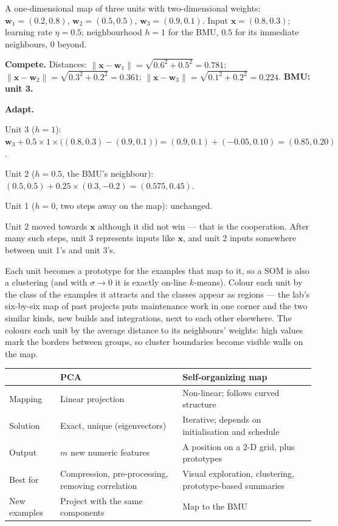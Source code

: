 \begin{worked}
A one-dimensional map of three units with two-dimensional weights:
$\mathbf{w}_1 = (0.2, 0.8)$, $\mathbf{w}_2 = (0.5, 0.5)$, $\mathbf{w}_3 = (0.9, 0.1)$.
Input $\mathbf{x} = (0.8, 0.3)$; learning rate $\eta = 0.5$; neighbourhood $h = 1$ for
the BMU, $0.5$ for its immediate neighbours, 0 beyond.

\smallskip
\textbf{Compete.} Distances: $\|\mathbf{x} - \mathbf{w}_1\| = \sqrt{0.6^2 + 0.5^2} = 0.781$;
$\|\mathbf{x} - \mathbf{w}_2\| = \sqrt{0.3^2 + 0.2^2} = 0.361$;
$\|\mathbf{x} - \mathbf{w}_3\| = \sqrt{0.1^2 + 0.2^2} = 0.224$. \textbf{BMU: unit 3.}

\textbf{Adapt.}
\begin{tight}
  \item Unit 3 ($h = 1$): $\mathbf{w}_3 + 0.5 \times 1 \times \big((0.8, 0.3) - (0.9, 0.1)\big)
        = (0.9, 0.1) + (-0.05, 0.10) = \mathbf{(0.85, 0.20)}$.
  \item Unit 2 ($h = 0.5$, the BMU's neighbour):
        $(0.5, 0.5) + 0.25 \times (0.3, -0.2) = \mathbf{(0.575, 0.45)}$.
  \item Unit 1 ($h = 0$, two steps away on the map): unchanged.
\end{tight}
Unit 2 moved towards $\mathbf{x}$ although it did not win --- that is the cooperation.
After many such steps, unit 3 represents inputs like $\mathbf{x}$, and unit 2 inputs
somewhere between unit 1's and unit 3's.
\end{worked}

\begin{conceptbox}
Each unit becomes a prototype for the examples that map to it, so a SOM is also a
clustering (and with $\sigma \to 0$ it is exactly on-line $k$-means). Colour each unit
by the class of the examples it attracts and the classes appear as regions --- the
lab's six-by-six map of past projects puts maintenance work in one corner and the
two similar kinds, new builds and integrations, next to each other elsewhere. The  colours each unit by the
average distance to its neighbours' weights: high values mark the borders between
groups, so cluster boundaries become visible walls on the map.
\end{conceptbox}

\begin{longtable}{@{}L{3.2cm}L{5.8cm}L{6.0cm}@{}}
\toprule
{}
\textbf{} & \textbf{PCA} & \textbf{Self-organizing map} \\
\midrule
\endhead
Mapping & Linear projection & Non-linear; follows curved structure \\
Solution & Exact, unique (eigenvectors) & Iterative; depends on initialisation and
schedule \\
Output & $m$ new numeric features & A position on a 2-D grid, plus prototypes \\
Best for & Compression, pre-processing, removing correlation & Visual exploration,
clustering, prototype-based summaries \\
New examples & Project with the same components & Map to the BMU \\
\bottomrule
\end{longtable}

